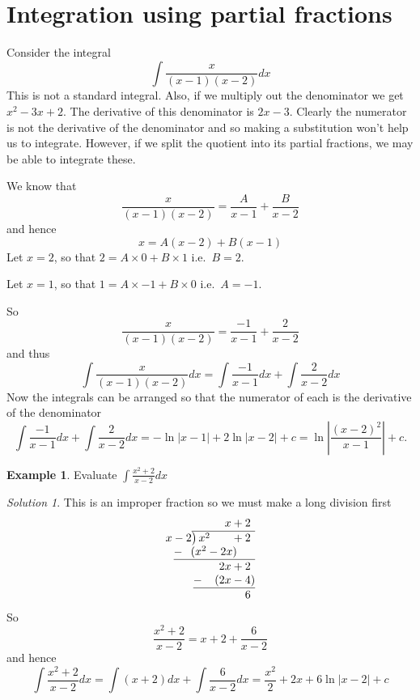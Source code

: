 \documentclass[
  11pt,
  oneside]{book}
\newcommand{\slide}{}
\theoremstyle{definition}
\theoremstyle{definition}
\newtheorem{example}{Example}[chapter]
\theoremstyle{definition}
\theoremstyle{definition}
\theoremstyle{remark}
\newtheorem*{solution}{Solution}
\begin{document}
\section{Integration using partial fractions}\label{integration-using-partial-fractions}

Consider the integral
\[
\int\frac{x}{(x-1)(x-2)}dx
\]
This is not a standard integral. Also, if we multiply out the denominator we get \(x^2 - 3x + 2\). The derivative of this denominator is \(2x - 3\). Clearly the numerator is not the derivative of the denominator and so making a substitution won't help us to integrate. However, if we split the quotient into its partial fractions, we may be able to integrate these.

We know that
\[
\frac{x}{(x-1)(x-2)} = \frac A{x-1}+\frac B{x-2}
\]
and hence
\[
x = A(x-2)+B(x-1)
\]
Let \(x=2\), so that \(2=A\times0+B\times1\) i.e.~\(B=2\).

Let \(x=1\), so that \(1=A\times-1+B\times0\) i.e.~\(A=-1\).

So
\[
\frac{x}{(x-1)(x-2)} = \frac {-1}{x-1}+\frac 2{x-2}
\]
and thus
\[
\int\frac{x}{(x-1)(x-2)}dx = \int\frac {-1}{x-1}dx+\int\frac 2{x-2}dx
\]
Now the integrals can be arranged so that the numerator of each is the derivative of the denominator
\[
\int\frac {-1}{x-1}dx+\int\frac 2{x-2}dx = -\ln|x-1|+2\ln|x-2|+c = \ln\left|\frac{(x-2)^2}{x-1}\right|+c.
\]
\slide

\begin{example}
Evaluate \(\displaystyle\int\frac{x^2+2}{x-2}dx\)
\end{example}

\begin{solution}
This is an improper fraction so we must make a long division first
\[
\begin{array}{r}
x+2\phantom{)}   \\
x-2{\overline{\smash{\big)}\,x^2\phantom{+2x}+2\phantom{)}}}\\
\underline{-~\phantom{(}(x^2-2x)\phantom{-b)}}\\
\phantom{0+}2x+2\phantom{)}\\ 
\underline{-~\phantom{()}(2x-4)}\\ 
\phantom{0+}6\phantom{)}
\end{array}
\]
So
\[
\frac{x^2+2}{x-2} = x+2+\frac6{x-2}
\]
and hence
\[
\int\frac{x^2+2}{x-2}dx = \int (x+2)dx+\int\frac6{x-2}dx = \frac{x^2}{2}+2x+6\ln|x-2|+c
\]
\end{solution}

\slide
\end{document}
